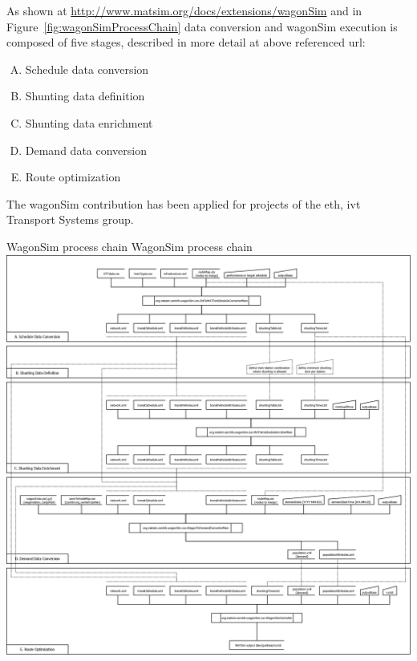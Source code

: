 As shown at \url{http://www.matsim.org/docs/extensions/wagonSim} and in Figure~\ref{fig:wagonSimProcessChain} data conversion and wagonSim execution is composed of five stages, described in more detail at above referenced url:
%
\begin{enumerate}[(A)]
\item Schedule data conversion
\item Shunting data definition
\item Shunting data enrichment
\item Demand data conversion
\item Route optimization
\end{enumerate}
%
The wagonSim \gls{contribution} has been applied for projects of the \gls{eth}, \gls{ivt} Transport Systems group.

\createfigure%
{WagonSim process chain}%
{WagonSim process chain}%
{\label{fig:wagonSimProcessChain}}%
{\includegraphics[width=1.\textwidth,angle=90]{extending/figures/wagonsim/wagonSimProcessChain.png}}%
{}

